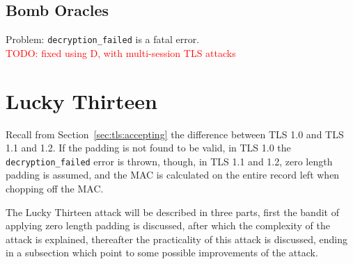 \documentclass[10pt,conference,a4paper]{IEEEtran}
\begin{document}
\subsection{Bomb Oracles}
\label{sec:paddingoracle:bomb}
Problem: \texttt{decryption\_failed} is a fatal error. \\
\textcolor{red}{TODO: fixed using D, with multi-session TLS attacks}



\section{Lucky Thirteen}
\label{sec:lucky}
Recall from Section~\ref{sec:tls:accepting} the difference between TLS 1.0 and TLS 1.1 and 1.2. If the padding is not found to be valid, in TLS 1.0 the \texttt{decryption\_failed} error is thrown, though, in TLS 1.1 and 1.2, zero length padding is assumed, and the MAC is calculated on the entire record left when chopping off the MAC.

The Lucky Thirteen attack will be described in three parts, first the bandit of applying zero length padding is discussed, after which the complexity of the attack is explained, thereafter the practicality of this attack is discussed, ending in a subsection which point to some possible improvements of the attack.

\end{document}
